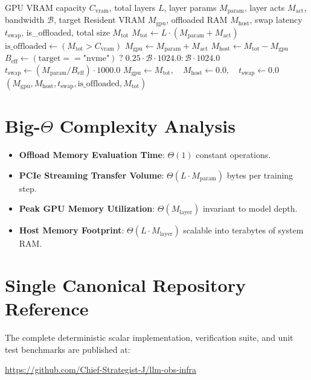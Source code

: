 \documentclass[11pt,a4paper]{article}
\theoremstyle{definition}
\begin{document}
\begin{algorithm}[H]
\caption{Hierarchical Memory Offloading and Swap Feasibility Evaluation}
\begin{algorithmic}[1]
\Require GPU VRAM capacity $C_{\text{vram}}$, total layers $L$, layer params $M_{\text{param}}$, layer acts $M_{\text{act}}$, bandwidth $\mathcal{B}$, target
\Ensure Resident VRAM $M_{\text{gpu}}$, offloaded RAM $M_{\text{host}}$, swap latency $t_{\text{swap}}$, is\_offloaded, total size $M_{\text{tot}}$
\State $M_{\text{tot}} \gets L \cdot (M_{\text{param}} + M_{\text{act}})$
\State $\text{is\_offloaded} \gets (M_{\text{tot}} > C_{\text{vram}})$
    \State $M_{\text{gpu}} \gets M_{\text{param}} + M_{\text{act}}$
    \State $M_{\text{host}} \gets M_{\text{tot}} - M_{\text{gpu}}$
    \State $B_{\text{eff}} \gets (\text{target} == \text{"nvme"}) \; ? \; 0.25 \cdot \mathcal{B} \cdot 1024.0 : \mathcal{B} \cdot 1024.0$
    \State $t_{\text{swap}} \gets (M_{\text{param}} / B_{\text{eff}}) \cdot 1000.0$
\Else
    \State $M_{\text{gpu}} \gets M_{\text{tot}}, \quad M_{\text{host}} \gets 0.0, \quad t_{\text{swap}} \gets 0.0$
\EndIf
\State \Return $(M_{\text{gpu}}, M_{\text{host}}, t_{\text{swap}}, \text{is\_offloaded}, M_{\text{tot}})$
\end{algorithmic}
\end{algorithm}

\section{Big-$\Theta$ Complexity Analysis}

\begin{itemize}
    \item \textbf{Offload Memory Evaluation Time}: $\Theta(1)$ constant operations.
    \item \textbf{PCIe Streaming Transfer Volume}: $\Theta(L \cdot M_{\text{param}})$ bytes per training step.
    \item \textbf{Peak GPU Memory Utilization}: $\Theta(M_{\text{layer}})$ invariant to model depth.
    \item \textbf{Host Memory Footprint}: $\Theta(L \cdot M_{\text{layer}})$ scalable into terabytes of system RAM.
\end{itemize}

\section{Single Canonical Repository Reference}

The complete deterministic scalar implementation, verification suite, and unit test benchmarks are published at:
\begin{center}
\url{https://github.com/Chief-Strategist-J/llm-obs-infra}
\end{center}
\end{document}
